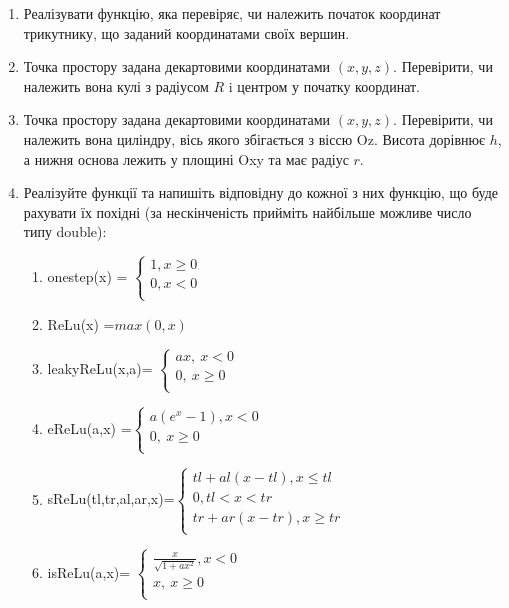 \documentclass[a5paper,titlepage,openany,twoside,draft]{book_unv}%
\makeatletter
\newcommand{\xslalph}[1]{\expandafter\@xslalph\csname c@#1\endcsname}
\newcommand{\@xslalph}[1]{%
    \ifcase#1\or а\or б\or в\or г\or д\or e\or є\or ж\or з\or i%
    \or й\or к\or л\or м\or н\or о\or п\or р\or с\or т%
    \or у\or ф\or х\or ц\or ч\or ш\or ю\or я\or аа\or бб\or вв%
    \else\@ctrerr\fi%
}
\makeatother
\begin{document}
\begin{enumerate}
\item
  Реалізувати функцію, яка перевіряє, чи належить початок координат
  трикутнику, що заданий координатами своїх вершин.
\item
  Точка простору задана декартовими координатами $(x, y, z)$. Перевірити,
  чи належить вона кулі з радіусом $R$ i центром у початку координат.
\item
  Точка простору задана декартовими координатами $(x, y, z)$. Перевірити,
  чи належить вона циліндру, вісь якого збігається з віссю Oz. Висота
  дорівнює $h$, а нижня основа лежить у площині Oxy та має радіус $r$.
\item
  Реалізуйте функції та напишіть відповідну до кожної з них функцію, що
  буде рахувати їх похідні (за нескінченість прийміть найбільше можливе 
число типу double):
\begin{enumerate}[label=\xslalph*)]
\item onestep(x) = \(\left\{ \begin{matrix}
1,x \geq 0 \\
0,x < 0 \\
\end{matrix} \right.\ \)

\item 
ReLu(x) =\(max(0,x)\)

\item
leakyReLu(x,a)= \(\left\{ \begin{matrix}
ax,\ x < 0 \\
0,\ x \geq 0 \\
\end{matrix} \right.\ \)

\item 
eReLu(a,x) =\(\left\{ \begin{matrix}
a(e^{x} - 1),x < 0 \\
0,\ x \geq 0 \\
\end{matrix} \right.\ \)

\item 
sReLu(tl,tr,al,ar,x)=\(\left\{ \begin{matrix}
tl + al\left( x - tl \right),x \leq tl \\
0,tl < x < tr \\
tr + ar\left( x - tr \right),x \geq tr \\
\end{matrix} \right.\ \)

\item
 isReLu(a,x)= \(\left\{ \begin{matrix}
\frac{x}{\sqrt{1 + ax^{2}}},x < 0 \\
x,\ x \geq 0 \\
\end{matrix} \right.\ \)


\end{enumerate}
\end{enumerate}
\end{document}

